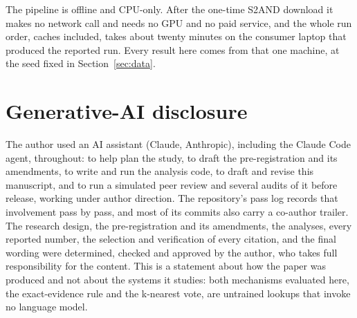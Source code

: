 \documentclass[11pt]{article}
\begin{document}
The pipeline is offline and CPU-only. After the one-time S2AND download it
makes no network call and needs no GPU and no paid service, and the whole
run order, caches included, takes about twenty minutes on the consumer
laptop that produced the reported run. Every result here comes from that one
machine, at the seed fixed in Section~\ref{sec:data}.

\section*{Generative-AI disclosure}

The author used an AI assistant (Claude, Anthropic), including the Claude
Code agent, throughout: to help plan the study, to draft the pre-registration
and its amendments, to write and run the analysis code, to draft and revise
this manuscript, and to run a simulated peer review and several audits of it
before release, working under author direction. The repository's pass log records that involvement pass by pass, and most of its commits also carry a co-author trailer. The research design, the pre-registration and its amendments, the
analyses, every reported number, the selection and verification of every
citation, and the final wording were determined, checked and approved by the
author, who takes full responsibility for the content. This is a statement
about how the paper was produced and not about the systems it studies: both
mechanisms evaluated here, the exact-evidence rule and the k-nearest vote,
are untrained lookups that invoke no language model.


\end{document}
